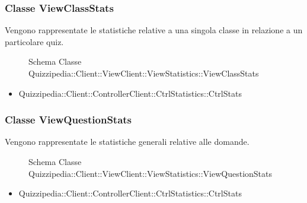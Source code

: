 \subsubsection{Classe ViewClassStats}
Vengono rappresentate le statistiche relative a una singola classe in relazione a un particolare quiz.
\begin{figure}[H]
\centering
\noindent{}
\caption{Schema Classe Quizzipedia::Client::ViewClient::ViewStatistics::ViewClassStats}
\end{figure}
\begin{itemize}
\item Quizzipedia::Client::ControllerClient::CtrlStatistics::CtrlStats
\end{itemize}
\subsubsection{Classe ViewQuestionStats}
Vengono rappresentate le statistiche generali relative alle domande.
\begin{figure}[H]
\centering
\noindent{}
\caption{Schema Classe Quizzipedia::Client::ViewClient::ViewStatistics::ViewQuestionStats}
\end{figure}
\begin{itemize}
\item Quizzipedia::Client::ControllerClient::CtrlStatistics::CtrlStats
\end{itemize}
